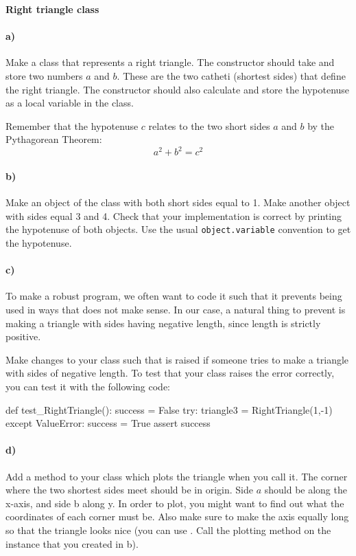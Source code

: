 \begin{Problem}{\textbf{Right triangle class}}
\paragraph{a)}
Make a class  that represents a right triangle. The constructor  should take and store two numbers $a$ and $b$. These are the two catheti (shortest sides) that define the right triangle. The constructor should also calculate and store the hypotenuse as a local variable in the class.

Remember that the hypotenuse $c$ relates to the two short sides $a$ and $b$ by the Pythagorean Theorem:
\begin{equation*}
    a^2 + b^2 = c^2
\end{equation*}

\paragraph{b)}
Make an object  of the class   with both short sides equal to 1. Make another object  with sides equal 3 and 4. Check that your implementation is correct by printing the hypotenuse of both objects. Use the usual \texttt{object.variable} convention to get the hypotenuse. 

\paragraph{c)}
To make a robust program, we often want to code it such that it prevents being used in ways that does not make sense. In our case, a natural thing to prevent is making a triangle with sides having negative length, since length is strictly positive.


Make changes to your class such that  is raised if someone tries to make a triangle with sides of negative length.
To test that your class raises the error correctly, you can test it with the following code:

\begin{python}
def test_RightTriangle():
    success = False
    try:
        triangle3 = RightTriangle(1,-1)
    except ValueError:
        success = True
    assert success
\end{python}

\paragraph{d)}
Add a method  to your class which plots the triangle when you call it. The corner where the two shortest sides meet should be in origin. Side $a$ should be along the x-axis, and side b along y. In order to plot, you might want to find out what the coordinates of each corner must be. Also make sure to make the axis equally long so that the triangle looks nice (you can use . Call the plotting method on the instance  that you created in b).


\end{Problem}
